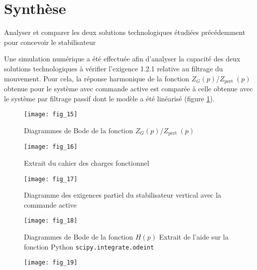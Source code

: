 \section{\label{part:5}Synthèse}
\begin{obj}
Analyser et comparer les deux solutions technologiques étudiées précédemment pour concevoir le stabilisateur
\end{obj}
Une simulation numérique a été effectuée afin d'analyser la capacité des deux solutions technologiques à vérifier l'exigence 1.2.1 relative au filtrage du mouvement. Pour cela, la réponse harmonique de la fonction $Z_{G}(p) / Z_{\text {pert }}(p)$ obtenue pour le système avec commande active est comparée à celle obtenue avec le système par filtrage passif dont le modèle a été linéarisé (figure \ref{fig:15}).

\begin{figure}[H]
\centering
\texttt{[image: fig\_15]}
\caption{\label{fig:15}  Diagrammes de Bode de la fonction $Z_{G}(p) / Z_{\text {pert }}(p)$}
\end{figure}



\ifprof
\begin{corrige}
\end{corrige}
\else
\fi

\ifprof
\begin{corrige}
\end{corrige}
\else
\fi



\begin{figure}[H]
\centering
\texttt{[image: fig\_16]}
\caption{\label{fig:A}  Extrait du cahier des charges fonctionnel}
\end{figure}

\begin{figure}[H]
\centering
\texttt{[image: fig\_17]}
\caption{\label{fig:B} Diagramme des exigences partiel du stabilisateur vertical avec la commande active}
\end{figure}

\begin{figure}[H]
\centering
\texttt{[image: fig\_18]}
\caption{\label{fig:C} Diagrammes de Bode de la fonction $H(p)$ Extrait de l'aide sur la fonction Python \texttt{scipy.integrate.odeint}}
\end{figure}

\begin{figure}[H]
\centering
\texttt{[image: fig\_19]}
\end{figure}

